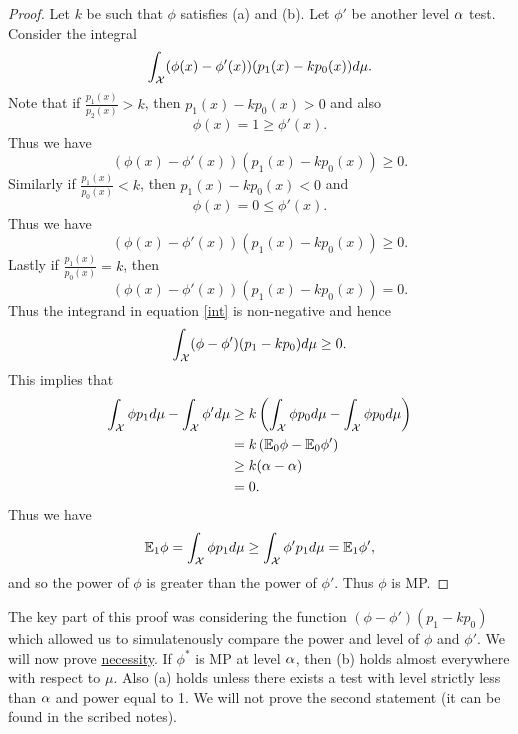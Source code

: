 \begin{proof}
    Let $k$ be such that $\phi$ satisfies (a) and (b). Let $\phi'$ be another level ${\alpha}$ test. Consider the integral
    \begin{equation}\label{int}
        \int_{\mathcal{X}} (\phi(x)-\phi'(x))(p_1(x)-kp_0(x))d\mu.
    \end{equation}
    Note that if $\frac{p_1(x)}{p_2(x)} > k$, then $p_1(x)-kp_0(x) > 0$ and also 
    \[\phi(x) = 1 \ge \phi'(x). \]
    Thus we have 
    \[ (\phi(x)-\phi'(x))(p_1(x)-kp_0(x)) \ge 0.\]
    Similarly if $\frac{p_1(x)}{p_0(x)} < k$, then $p_1(x)-kp_0(x) < 0$ and 
    \[\phi(x) = 0 \le \phi'(x). \]
    Thus we have
    \[(\phi(x)-\phi'(x))(p_1(x)-kp_0(x)) \ge 0. \]
    Lastly if $\frac{p_1(x)}{p_0(x)} = k$, then 
    \[(\phi(x)-\phi'(x))(p_1(x)-kp_0(x))=0. \]
    Thus the integrand in equation \eqref{int} is non-negative and hence  
    \[\int_{\mathcal{X}} (\phi-\phi')(p_1-kp_0)d\mu \ge 0. \]
    This implies that 
    \begin{align*}
        \int_{\mathcal{X}} \phi p_1d\mu - \int_{\mathcal{X}} \phi' d\mu & \ge k\left(\int_{\mathcal{X}} \phi p_0d\mu - \int_{\mathcal{X}} \phi p_0d\mu \right)\\
        &= k\left({\mathbb{E}}_0 \phi - {\mathbb{E}}_0 \phi'\right)\\
        &\ge k({\alpha}-{\alpha})\\
        &=0.
    \end{align*}
    Thus we have 
    \[{\mathbb{E}}_1 \phi = \int_{\mathcal{X}} \phi p_1d\mu \ge \int_{\mathcal{X}} \phi' p_1d\mu = {\mathbb{E}}_1 \phi', \]
    and so the power of $\phi$ is greater than the power of $\phi'$. Thus $\phi$ is MP.
\end{proof}
The key part of this proof was considering the function $(\phi-\phi')(p_1-kp_0)$ which allowed us to simulatenously compare the power and level of $\phi$ and $\phi'$. We will now prove \underline{necessity}. If $\phi^*$ is MP at level ${\alpha}$, then (b) holds almost everywhere with respect to $\mu$. Also (a) holds unless there exists a test with level strictly less than ${\alpha}$ and power equal to 1. We will not prove the second statement (it can be found in the scribed notes).
